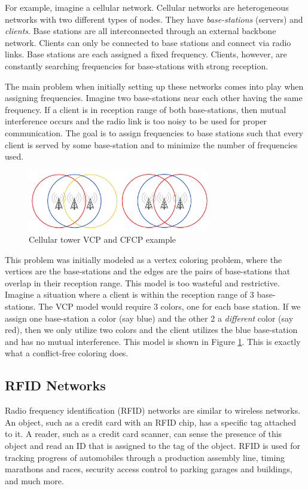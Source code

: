\documentclass{sig-alternate}
\begin{document}
For example, imagine a cellular network. Cellular networks are heterogeneous networks with two different types of nodes. They have \emph{base-stations} (servers) and \emph{clients}. Base stations are all interconnected through an external backbone network. Clients can only be connected to base stations and connect via radio links. Base stations are each assigned a fixed frequency. Clients, however, are constantly searching frequencies for base-stations with strong reception.

The main problem when initially setting up these networks comes into play when assigning frequencies. Imagine two base-stations near each other having the same frequency. If a client is in reception range of both base-stations, then mutual interference occurs and the radio link is too noisy to be used for proper communication. The goal is to assign frequencies to base stations such that every client is served by some base-station and to minimize the number of frequencies used.

\begin{figure}[h]
	\centering
	\includegraphics[width=8cm,trim=4 4 4 4,clip]{../figures/towers.pdf}
	\caption{Cellular tower VCP and CFCP example}\label{fig:towers}
\end{figure}

\vspace{-0.1cm}

This problem was initially modeled as a vertex coloring problem, where the vertices are the base-stations and the edges are the pairs of base-stations that overlap in their reception range. This model is too wasteful and restrictive. Imagine a situation where a client is within the reception range of 3 base-stations. The VCP model would require 3 colors, one for each base station. If we assign one base-station a color (say blue) and the other 2 a \emph{different} color (say red), then we only utilize two colors and the client utilizes the blue base-station and has no mutual interference. This model is shown in Figure \ref{fig:towers}. This is exactly what a conflict-free coloring does. \cite{smorodinsky2013conflict}

\subsection{RFID Networks}
Radio frequency identification (RFID) networks are similar to wireless networks. An object, such as a credit card with an RFID chip, has a specific tag attached to it. A reader, such as a credit card scanner, can sense the presence of this object and read an ID that is assigned to the tag of the object. RFID is used for tracking progress of automobiles through a production assembly line, timing marathons and races, security access control to parking garages and buildings, and much more.
\end{document}

